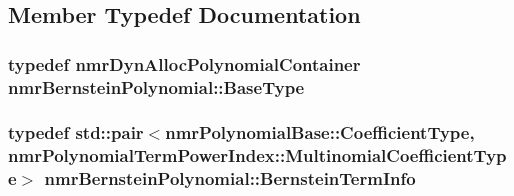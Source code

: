 \subsection{Member Typedef Documentation}
\hypertarget{classnmr_bernstein_polynomial_a8a0eb11ca4ee788e0f3714dd0e1f2e53}{
\subsubsection[{Base\-Type}]{\setlength{\rightskip}{0pt plus 5cm}typedef {\bf nmr\-Dyn\-Alloc\-Polynomial\-Container} {\bf nmr\-Bernstein\-Polynomial\-::\-Base\-Type}}}\label{classnmr_bernstein_polynomial_a8a0eb11ca4ee788e0f3714dd0e1f2e53}
\hypertarget{classnmr_bernstein_polynomial_ad8d87d00b90dcd2de08a43e90c07a0a6}{
\subsubsection[{Bernstein\-Term\-Info}]{\setlength{\rightskip}{0pt plus 5cm}typedef std\-::pair$<${\bf nmr\-Polynomial\-Base\-::\-Coefficient\-Type}, {\bf nmr\-Polynomial\-Term\-Power\-Index\-::\-Multinomial\-Coefficient\-Type}$>$ {\bf nmr\-Bernstein\-Polynomial\-::\-Bernstein\-Term\-Info}}}\label{classnmr_bernstein_polynomial_ad8d87d00b90dcd2de08a43e90c07a0a6}


